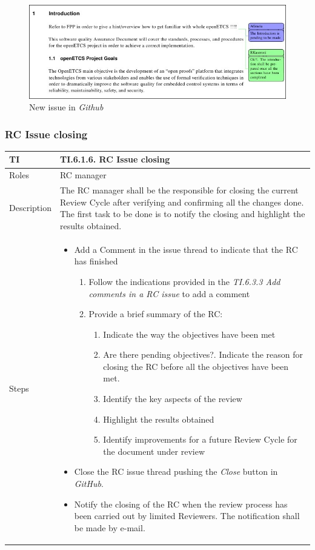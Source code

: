 \documentclass{template/openetcs_article}
\begin{document}
\begin{figure}
\centering
\includegraphics [width=\textwidth]{./figures/CommentConfirmation.JPG}
\caption{New issue in {\it Github}}
\end{figure}

\subsubsection{RC Issue closing}

\begin{flushleft}
\tablefirsthead{}
\tablehead{}
\tabletail{}
\tablelasttail{}
\begin{supertabular}{|m{2cm}|m{13cm}|}
\hline
{}
TI & 
TI.6.1.6. RC Issue closing
\\\hline
Roles &
RC manager
\\\hline
Description &
The RC manager shall be the responsible for closing the current Review Cycle after verifying and confirming all the changes done. The first task to be done is to notify the closing and highlight the results obtained.
\\\hline
Steps &
\begin{itemize}
\item Add a Comment in the issue thread to indicate that the RC has finished
\begin{enumerate}
\item Follow the indications provided in the {\it TI.6.3.3 Add comments in a RC issue} to add a comment
\item Provide a brief summary of the RC:
\begin{enumerate}
\item Indicate the way the objectives have been met 
\item Are there pending objectives?. Indicate the reason for closing the RC before all the objectives have been met.
\item Identify the key aspects of the review
\item Highlight the results obtained
\item Identify improvements for a future Review Cycle for the document under review
\end{enumerate}
\end{enumerate}
\item Close the RC issue thread pushing the {\it Close} button in {\it GitHub}.
\item Notify the closing of the RC when the review process has been carried out by limited Reviewers. The notification shall be made by e-mail.
\end{itemize}
\\\hline
\end{supertabular}
\end{flushleft}
\end{document}
